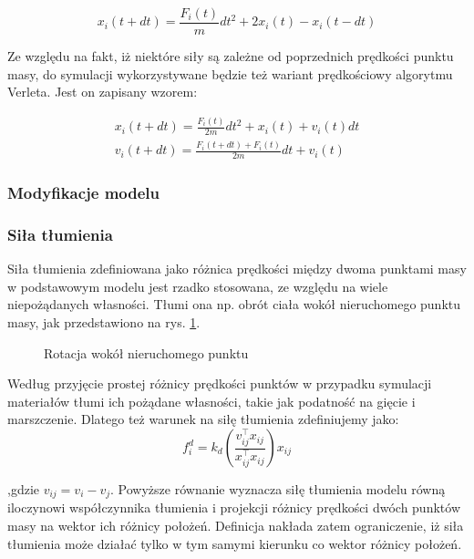 \begin{equation}
x_i(t + dt) = \frac{F_i(t)}{m} dt^2 + 2x_i(t) - x_i(t - dt)
\end{equation}

Ze względu na fakt, iż niektóre siły są zależne od poprzednich prędkości punktu masy, do symulacji wykorzystywane będzie też wariant prędkościowy algorytmu Verleta. Jest on zapisany wzorem:

\begin{eqnarray}
x_i(t + dt) = \frac{F_i(t)}{2m} dt^2 + x_i(t) + v_i(t)dt \\
v_i(t + dt) = \frac{F_i(t + dt) + F_i(t)}{2m}dt + v_i(t)
\end{eqnarray}

%
%
\subsubsection{Modyfikacje modelu}

\subsubsection{Siła tłumienia}
Siła tłumienia zdefiniowana jako różnica prędkości między dwoma punktami masy w podstawowym modelu jest rzadko stosowana, ze względu na wiele niepożądanych własności. Tłumi ona np. obrót ciała wokół nieruchomego punktu masy, jak przedstawiono na rys. \ref{tlumienie}.

\begin{figure}[ht]
\centering

\caption{Rotacja wokół nieruchomego punktu}
\label{tlumienie}
\end{figure}

Według \cite{pbdo} przyjęcie prostej różnicy prędkości punktów w przypadku symulacji materiałów tłumi ich pożądane własności, takie jak podatność na gięcie i marszczenie. Dlatego też warunek na siłę tłumienia zdefiniujemy jako:
\begin{equation}
f^{d}_i = k_d (\frac{v_{ij}^\intercal x_{ij}}{x_{ij}^\intercal x_{ij}}) x_{ij}
\end{equation}

,gdzie $v_{ij} = v_i - v_j$. Powyższe równanie wyznacza siłę tłumienia modelu równą iloczynowi współczynnika tłumienia i projekcji różnicy prędkości dwóch punktów masy na wektor ich różnicy położeń. Definicja nakłada zatem ograniczenie, iż siła tłumienia może działać tylko w tym samymi kierunku co wektor różnicy położeń.


